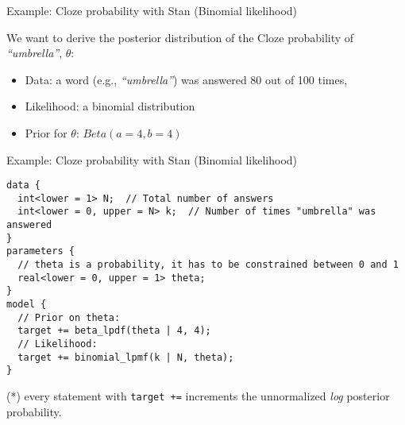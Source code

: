 \documentclass[12pt,ignorenonframetext,aspectratio=169]{beamer}
\providecommand{\tightlist}{%
  \setlength{\itemsep}{0pt}\setlength{\parskip}{0pt}}
\begin{document}
\begin{frame}{Example: Cloze probability with Stan (Binomial likelihood)}
\protect\hypertarget{sec:clozestan}{}

\begin{block}{We want to derive the posterior distribution of the Cloze probability of \emph{``umbrella''}, \(\theta\):}

\begin{itemize}
\tightlist
\item
  Data: a word (e.g., \emph{``umbrella''}) was answered 80 out of 100 times,
\item
  Likelihood: a binomial distribution
\item
  Prior for \(\theta\): \(Beta(a=4,b=4)\)
\end{itemize}

\end{block}

\end{frame}

\begin{frame}[fragile]{Example: Cloze probability with Stan (Binomial likelihood)}
\protect\hypertarget{sec:clozestan}{}

\scriptsize

\begin{verbatim}
data {
  int<lower = 1> N;  // Total number of answers 
  int<lower = 0, upper = N> k;  // Number of times "umbrella" was answered
}
parameters {
  // theta is a probability, it has to be constrained between 0 and 1
  real<lower = 0, upper = 1> theta;
}
model {
  // Prior on theta:
  target += beta_lpdf(theta | 4, 4); 
  // Likelihood:
  target += binomial_lpmf(k | N, theta); 
}
\end{verbatim}

\normalsize

(*) every statement with \texttt{target\ +=} increments the unnormalized \emph{log} posterior probability.

\end{frame}
\end{document}
